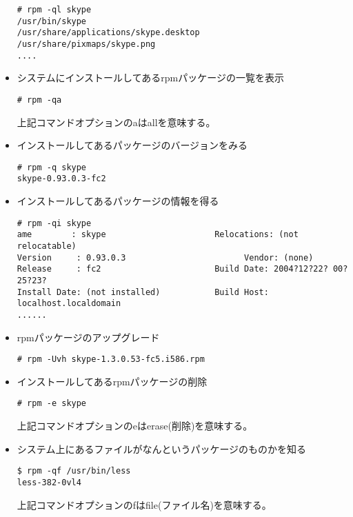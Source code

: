\documentclass{jreport}
\begin{document}
\begin{itemize}
\begin{screen}
\begin{verbatim}
# rpm -ql skype
/usr/bin/skype
/usr/share/applications/skype.desktop
/usr/share/pixmaps/skype.png
....
\end{verbatim}
\end{screen}
\item {システムにインストールしてあるrpmパッケージの一覧を表示}
\begin{screen}
\begin{verbatim}
# rpm -qa
\end{verbatim}
\end{screen}
上記コマンドオプションのaはallを意味する。
\item {インストールしてあるパッケージのバージョンをみる}
\begin{screen}
\begin{verbatim}
# rpm -q skype
skype-0.93.0.3-fc2
\end{verbatim}
\end{screen}
\item {インストールしてあるパッケージの情報を得る}
\begin{screen}
\begin{verbatim}
# rpm -qi skype
ame        : skype                      Relocations: (not relocatable)
Version     : 0.93.0.3                        Vendor: (none)
Release     : fc2                       Build Date: 2004?12?22? 00?25?23?
Install Date: (not installed)           Build Host: localhost.localdomain
......
\end{verbatim}
\end{screen}
\item {rpmパッケージのアップグレード}
\begin{screen}
\begin{verbatim}
# rpm -Uvh skype-1.3.0.53-fc5.i586.rpm
\end{verbatim}
\end{screen}
\item {インストールしてあるrpmパッケージの削除}
\begin{screen}
\begin{verbatim}
# rpm -e skype
\end{verbatim}
\end{screen}
上記コマンドオプションのeはerase(削除)を意味する。
\item システム上にあるファイルがなんというパッケージのものかを知る
\begin{screen}
\begin{verbatim}
$ rpm -qf /usr/bin/less
less-382-0vl4
\end{verbatim}
\end{screen}
上記コマンドオプションのfはfile(ファイル名)を意味する。
\end{itemize}
\end{document}
